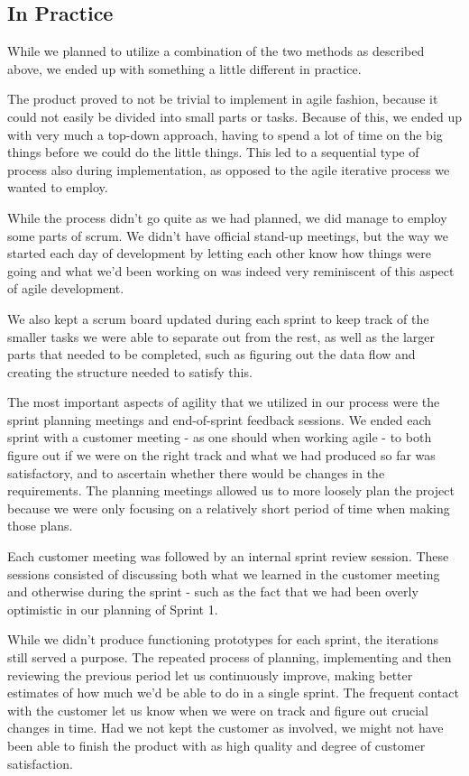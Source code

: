 \newpage %
\subsection{In Practice}\label{methodInPractice}
While we planned to utilize a combination of the two methods as described above, we ended up with something a little different in practice.

The product proved to not be trivial to implement in agile fashion, because it could not easily be divided into small parts or tasks. Because of this, we ended up with very much a top-down approach, having to spend a lot of time on the big things before we could do the little things. This led to a sequential type of process also during implementation, as opposed to the agile iterative process we wanted to employ.

While the process didn't go quite as we had planned, we did manage to employ some parts of scrum. We didn't have official stand-up meetings, but the way we started each day of development by letting each other know how things were going and what we'd been working on was indeed very reminiscent of this aspect of agile development.

We also kept a scrum board updated during each sprint to keep track of the smaller tasks we were able to separate out from the rest, as well as the larger parts that needed to be completed, such as figuring out the data flow and creating the structure needed to satisfy this.

The most important aspects of agility that we utilized in our process were the sprint planning meetings and end-of-sprint feedback sessions. We ended each sprint with a customer meeting - as one should when working agile - to both figure out if we were on the right track and what we had produced so far was satisfactory, and to ascertain whether there would be changes in the requirements. The planning meetings allowed us to more loosely plan the project because we were only focusing on a relatively short period of time when making those plans.

Each customer meeting was followed by an internal sprint review session. These sessions consisted of discussing both what we learned in the customer meeting and otherwise during the sprint - such as the fact that we had been overly optimistic in our planning of Sprint 1.

While we didn't produce functioning prototypes for each sprint, the iterations still served a purpose. The repeated process of planning, implementing and then reviewing the previous period let us continuously improve, making better estimates of how much we'd be able to do in a single sprint. The frequent contact with the customer let us know when we were on track and figure out crucial changes in time. Had we not kept the customer as involved, we might not have been able to finish the product with as high quality and degree of customer satisfaction.